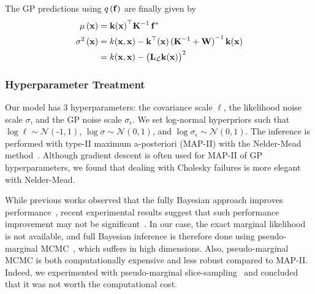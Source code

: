 The GP predictions using \(q\,(\mathbf{f})\) are finally given by
\begin{align}
  \mu\,(\mathbf{x})
  &= {\mathbf{k}(\mathbf{x})}^{\top} \mathbf{K}^{-1} \, \mathbf{f}^*  \\
  \sigma^2\,(\mathbf{x})
  &= k(\mathbf{x}, \mathbf{x}) - \mathbf{k}^{\top}(\mathbf{x}) \, {(\mathbf{K}^{-1} + \mathbf{W})}^{-1} \, \mathbf{k}(\mathbf{x}) \\
  &= k(\mathbf{x}, \mathbf{x}) - {\big( \mathbf{L}_{\mathcal{L}} \mathbf{k}(\mathbf{x}) \big)}^2
\end{align}

\subsubsection{Hyperparameter Treatment}
Our model has 3 hyperparameters: the covariance scale \(\ell\), the likelihood noise scale \(\sigma\), and the GP noise scale \(\sigma_\epsilon\).
We set log-normal hyperpriors such that \(\log \ell \sim \mathcal{N}\left(\text{-}1, 1\right)\), \(\log \sigma \sim \mathcal{N}\left(0, 1\right)\), and \(\log \sigma_{\epsilon} \sim \mathcal{N}\left(0, 1\right)\).
The inference is performed with type-II maximum a-posteriori (MAP-II) with the Nelder-Mead method~\cite{nelder_simplex_1965}.
Although gradient descent is often used for MAP-II of GP hyperparameters, we found that dealing with Cholesky failures is more elegant with Nelder-Mead.

While previous works observed that the fully Bayesian approach improves performance~\cite{henrandez-lobato_predictive_2014, snoek_practical_2012}, recent experimental results suggest that such performance improvement may not be significant~\cite{ath_bayesian_2021}.
In our case, the exact marginal likelihood is not available, and full Bayesian inference is therefore done using pseudo-marginal MCMC~\cite{filippone_pseudomarginal_2014, pmlr-v51-murray16}, which suffers in high dimensions.
Also, pseudo-marginal MCMC is both computationally expensive and less robust compared to MAP-II.
Indeed, we experimented with pseudo-marginal slice-sampling~\cite{pmlr-v51-murray16} and concluded that it was not worth the computational cost.




